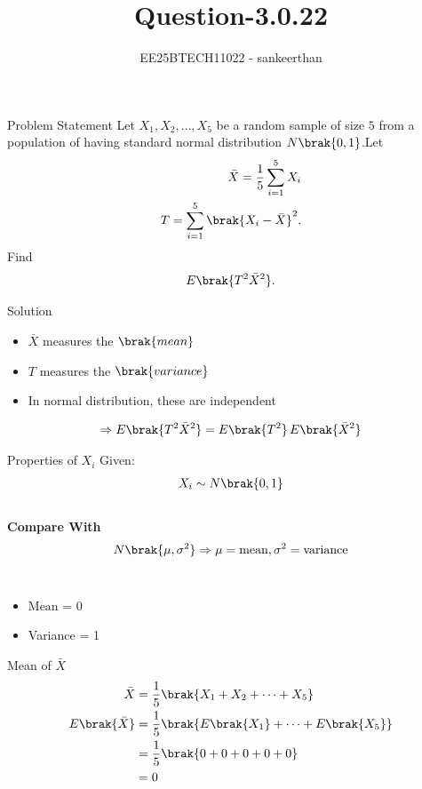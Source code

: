 \documentclass{beamer}
\title{Question-3.0.22}
\author{EE25BTECH11022 - sankeerthan}
\date{}
\begin{document}
\frame{\titlepage}
\begin{frame}{Problem Statement}
Let $X_1, X_2, \dots, X_5$ be a random sample of size $5$ from a population of having standard normal distribution $N\brak{0,1}$.Let
\begin{align}
\bar{X} = \frac{1}{5}\sum_{i=1}^{5} X_i
\\
T = \sum_{i=1}^{5} \brak{X_i - \bar{X}}^2.
\end{align}
Find
\begin{align}
E\brak{T^2 \bar{X}^2}.
\end{align}

\end{frame}


\begin{frame}{Solution}
\begin{itemize}
\item $\bar{X}$ measures the  $\brak{mean}$
\item $T$ measures the $\brak{variance}$
\item In normal distribution, these are independent
\end{itemize}
\begin{align}
\Rightarrow E\brak{T^2 \bar{X}^2} = E\brak{T^2}\,E\brak{\bar{X}^2}
\end{align}
\end{frame}


\begin{frame}{Properties of $X_i$}
Given: \\
\begin{align}
 X_i \sim N\brak{0,1}
\end{align}
\\
\textbf{Compare With} 
\begin{align}
N\brak{\mu, \sigma^2} \Rightarrow \mu =\text{mean},\sigma^2 = \text{variance}
\end{align}\\
\begin{itemize}
\item Mean = 0
\item Variance = 1
\end{itemize}
\end{frame}

\begin{frame}{Mean of $\bar{X}$}
\begin{align}
\bar{X} &= \frac{1}{5}\brak{X_1 + X_2 + \cdots + X_5}\\
E\brak{\bar{X}} &= \frac{1}{5}\brak{E\brak{X_1}+\cdots+E\brak{X_5}}\\
&= \frac{1}{5}\brak{0+0+0+0+0} \\
&= 0
\end{align}
\end{frame}
\end{document}
